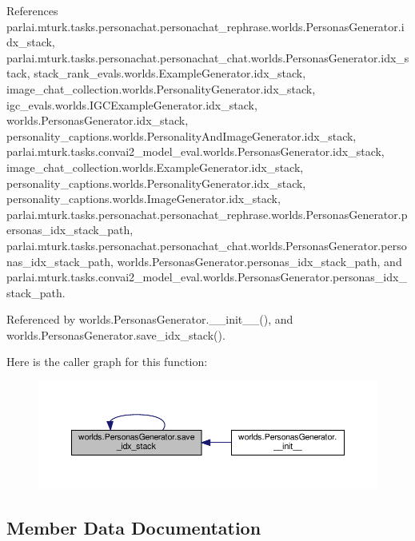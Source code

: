 References parlai.\+mturk.\+tasks.\+personachat.\+personachat\+\_\+rephrase.\+worlds.\+Personas\+Generator.\+idx\+\_\+stack, parlai.\+mturk.\+tasks.\+personachat.\+personachat\+\_\+chat.\+worlds.\+Personas\+Generator.\+idx\+\_\+stack, stack\+\_\+rank\+\_\+evals.\+worlds.\+Example\+Generator.\+idx\+\_\+stack, image\+\_\+chat\+\_\+collection.\+worlds.\+Personality\+Generator.\+idx\+\_\+stack, igc\+\_\+evals.\+worlds.\+I\+G\+C\+Example\+Generator.\+idx\+\_\+stack, worlds.\+Personas\+Generator.\+idx\+\_\+stack, personality\+\_\+captions.\+worlds.\+Personality\+And\+Image\+Generator.\+idx\+\_\+stack, parlai.\+mturk.\+tasks.\+convai2\+\_\+model\+\_\+eval.\+worlds.\+Personas\+Generator.\+idx\+\_\+stack, image\+\_\+chat\+\_\+collection.\+worlds.\+Example\+Generator.\+idx\+\_\+stack, personality\+\_\+captions.\+worlds.\+Personality\+Generator.\+idx\+\_\+stack, personality\+\_\+captions.\+worlds.\+Image\+Generator.\+idx\+\_\+stack, parlai.\+mturk.\+tasks.\+personachat.\+personachat\+\_\+rephrase.\+worlds.\+Personas\+Generator.\+personas\+\_\+idx\+\_\+stack\+\_\+path, parlai.\+mturk.\+tasks.\+personachat.\+personachat\+\_\+chat.\+worlds.\+Personas\+Generator.\+personas\+\_\+idx\+\_\+stack\+\_\+path, worlds.\+Personas\+Generator.\+personas\+\_\+idx\+\_\+stack\+\_\+path, and parlai.\+mturk.\+tasks.\+convai2\+\_\+model\+\_\+eval.\+worlds.\+Personas\+Generator.\+personas\+\_\+idx\+\_\+stack\+\_\+path.



Referenced by worlds.\+Personas\+Generator.\+\_\+\+\_\+init\+\_\+\+\_\+(), and worlds.\+Personas\+Generator.\+save\+\_\+idx\+\_\+stack().

Here is the caller graph for this function\+:
\nopagebreak
\begin{figure}[H]
\begin{center}
\leavevmode
\includegraphics[width=350pt]{classworlds_1_1PersonasGenerator_a5a71b02bc024659c63d0f5416de64fe8_icgraph}
\end{center}
\end{figure}


\subsection{Member Data Documentation}
\mbox{\label{classworlds_1_1PersonasGenerator_aca7d1eab201b4561c0162d0992803d6b}} 
